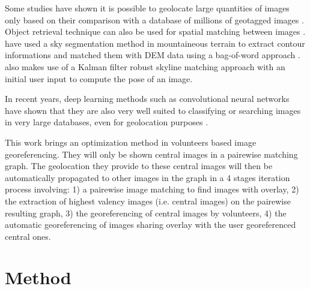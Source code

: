 \documentclass[fleqn,10pt]{wlpeerj} %
\begin{document}
Some studies have shown it is possible to geolocate large quantities of 
images only based on their comparison with a database of millions of geotagged 
images \citep{hays2015,weyand2016}. Object retrieval technique can also be used 
for spatial matching between images \citep{philbin2007}. 
\cite{baatz2012} have used a sky segmentation method in mountaineous terrain 
to extract contour informations and matched them with DEM data using a 
bag-of-word approach \citep{feifei2005}. \cite{produit2014} also makes use
of a Kalman filter robust skyline matching approach with an initial user input 
to compute the pose of an image.


In recent years, deep learning methods such as convolutional neural networks 
\citep{lecun2015deep} have shown that they are also very well suited to classifying 
or searching images in very large databases, even for geolocation purposes \citep{weyand2016}.

This work brings an optimization method in volunteers based image georeferencing.
They will only be shown central images in a pairewise matching graph. 
The geolocation they provide to these central images will then be automatically 
propagated to other images in the graph in a 4 stages iteration process involving:
1) a pairewise image matching to find images with overlay, 
2) the extraction of highest valency images (i.e. central images) on the 
pairewise resulting graph, 
3) the georeferencing of central images by volunteers, 
4) the automatic georeferencing of images sharing overlay with the user 
georeferenced central ones.

\section*{Method}
\end{document}
